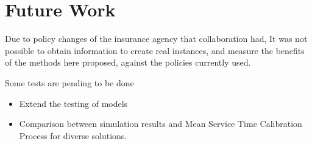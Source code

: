 \section{Future Work}
Due to policy changes
of the insurance agency that collaboration had,
It was not possible to obtain information
to create real instances,
and measure the benefits of the methods here proposed,
against the policies currently used.

Some tests are pending to be done
\begin{itemize}
\item Extend the testing of models
\item Comparison between simulation results
  and Mean Service Time Calibration Process
  for diverse solutions.
\end{itemize}
